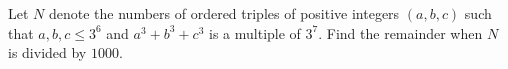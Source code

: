 Let $N$ denote the numbers of ordered triples of positive integers $(a, b, c)$ such that $a, b, c \le 3^6$ and $a^3 + b^3 + c^3$ is a multiple of $3^7$. Find the remainder when $N$ is divided by $1000$.